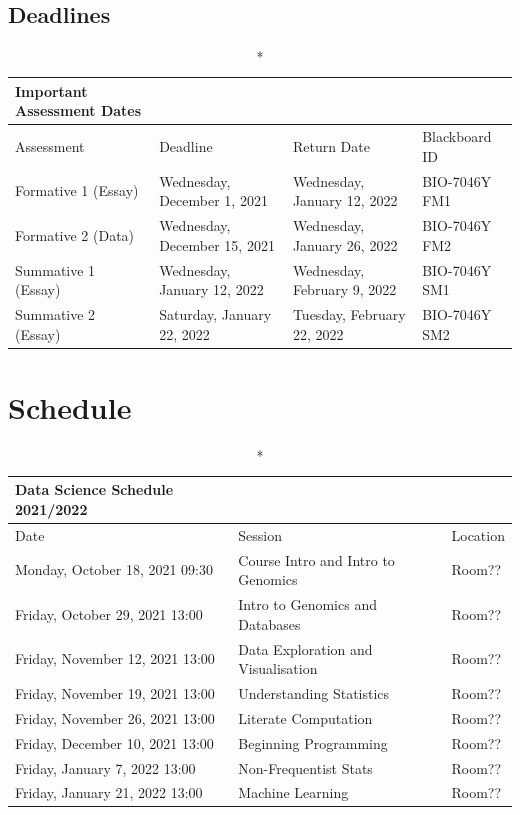 \documentclass[
]{book}
\begin{document}
\hypertarget{deadlines}{%
\subsection{Deadlines}\label{deadlines}}

\captionsetup[table]{labelformat=empty,skip=1pt}
\begin{longtable}{llll}
\caption*{
{\large Important Assessment Dates}
} \\ 
\toprule
Assessment & Deadline & Return Date & Blackboard ID \\ 
\midrule
Formative 1 (Essay) & Wednesday, December 1, 2021 & Wednesday, January 12, 2022 & BIO-7046Y FM1 \\ 
Formative 2 (Data) & Wednesday, December 15, 2021 & Wednesday, January 26, 2022 & BIO-7046Y FM2 \\ 
Summative 1 (Essay) & Wednesday, January 12, 2022 & Wednesday, February 9, 2022 & BIO-7046Y SM1 \\ 
Summative 2 (Essay) & Saturday, January 22, 2022 & Tuesday, February 22, 2022 & BIO-7046Y SM2 \\ 
 \bottomrule
\end{longtable}

\hypertarget{schedule}{%
\section{Schedule}\label{schedule}}

\captionsetup[table]{labelformat=empty,skip=1pt}
\begin{longtable}{lll}
\caption*{
{\large Data Science Schedule 2021/2022}
} \\ 
\toprule
Date & Session & Location \\ 
\midrule
Monday, October 18, 2021 09:30 & Course Intro and Intro to Genomics & Room?? \\ 
Friday, October 29, 2021 13:00 & Intro to Genomics and Databases & Room?? \\ 
Friday, November 12, 2021 13:00 & Data Exploration and Visualisation & Room?? \\ 
Friday, November 19, 2021 13:00 & Understanding Statistics & Room?? \\ 
Friday, November 26, 2021 13:00 & Literate Computation & Room?? \\ 
Friday, December 10, 2021 13:00 & Beginning Programming & Room?? \\ 
Friday, January 7, 2022 13:00 & Non-Frequentist Stats & Room?? \\ 
Friday, January 21, 2022 13:00 & Machine Learning & Room?? \\ 
 \bottomrule
\end{longtable}
\end{document}
